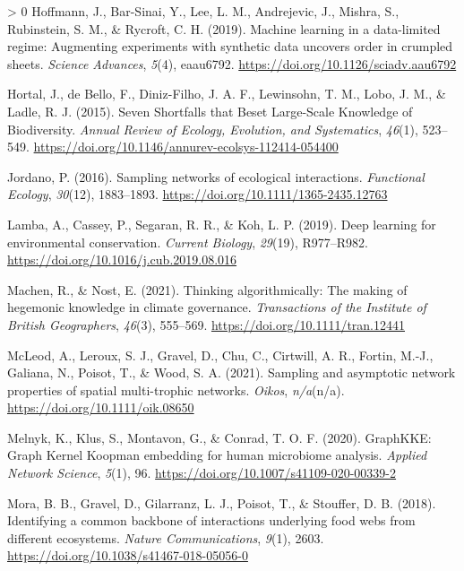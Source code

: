 \documentclass[10pt,oneside]{article}
\newlength{\cslhangindent}
\newenvironment{CSLReferences}[3] %
 {%
  \setlength{\parindent}{0pt}
  \ifodd #1 \everypar{\setlength{\hangindent}{\cslhangindent}}\ignorespaces\fi
  \ifnum #2 > 0
  \setlength{\parskip}{#2\baselineskip}
  \fi
 }%
 {}
\begin{document}
\begin{CSLReferences}{1}{0}
\leavevmode\hypertarget{ref-Hoffmann2019MacLea}{}%
Hoffmann, J., Bar-Sinai, Y., Lee, L. M., Andrejevic, J., Mishra, S.,
Rubinstein, S. M., \& Rycroft, C. H. (2019). Machine learning in a
data-limited regime: Augmenting experiments with synthetic data uncovers
order in crumpled sheets. \emph{Science Advances}, \emph{5}(4),
eaau6792. \url{https://doi.org/10.1126/sciadv.aau6792}

\leavevmode\hypertarget{ref-Hortal2015SevSho}{}%
Hortal, J., de Bello, F., Diniz-Filho, J. A. F., Lewinsohn, T. M., Lobo,
J. M., \& Ladle, R. J. (2015). Seven Shortfalls that Beset Large-Scale
Knowledge of Biodiversity. \emph{Annual Review of Ecology, Evolution,
and Systematics}, \emph{46}(1), 523--549.
\url{https://doi.org/10.1146/annurev-ecolsys-112414-054400}

\leavevmode\hypertarget{ref-Jordano2016SamNet}{}%
Jordano, P. (2016). Sampling networks of ecological interactions.
\emph{Functional Ecology}, \emph{30}(12), 1883--1893.
\url{https://doi.org/10.1111/1365-2435.12763}

\leavevmode\hypertarget{ref-Lamba2019DeeLea}{}%
Lamba, A., Cassey, P., Segaran, R. R., \& Koh, L. P. (2019). Deep
learning for environmental conservation. \emph{Current Biology},
\emph{29}(19), R977--R982.
\url{https://doi.org/10.1016/j.cub.2019.08.016}

\leavevmode\hypertarget{ref-Machen2021ThiAlg}{}%
Machen, R., \& Nost, E. (2021). Thinking algorithmically: The making of
hegemonic knowledge in climate governance. \emph{Transactions of the
Institute of British Geographers}, \emph{46}(3), 555--569.
\url{https://doi.org/10.1111/tran.12441}

\leavevmode\hypertarget{ref-McLeod2021SamAsy}{}%
McLeod, A., Leroux, S. J., Gravel, D., Chu, C., Cirtwill, A. R., Fortin,
M.-J., Galiana, N., Poisot, T., \& Wood, S. A. (2021). Sampling and
asymptotic network properties of spatial multi-trophic networks.
\emph{Oikos}, \emph{n/a}(n/a). \url{https://doi.org/10.1111/oik.08650}

\leavevmode\hypertarget{ref-Melnyk2020GraGra}{}%
Melnyk, K., Klus, S., Montavon, G., \& Conrad, T. O. F. (2020).
GraphKKE: Graph Kernel Koopman embedding for human microbiome analysis.
\emph{Applied Network Science}, \emph{5}(1), 96.
\url{https://doi.org/10.1007/s41109-020-00339-2}

\leavevmode\hypertarget{ref-Mora2018IdeCom}{}%
Mora, B. B., Gravel, D., Gilarranz, L. J., Poisot, T., \& Stouffer, D.
B. (2018). Identifying a common backbone of interactions underlying food
webs from different ecosystems. \emph{Nature Communications},
\emph{9}(1), 2603. \url{https://doi.org/10.1038/s41467-018-05056-0}


\end{CSLReferences}
\end{document}
